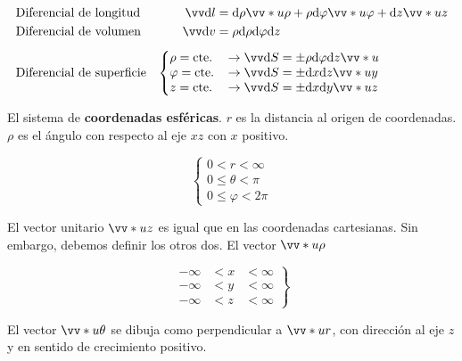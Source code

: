 \documentclass[10pt]{book}
\begin{document}
\begin{align*}
                           & \text{Diferencial de longitud}   & \vec{\dd l}  & = \dd \rho \vv*{u}{\rho} + \rho\dd \varphi \vv*{u}{\varphi} + \dd z \vv*{u}{z} \\
                           & \text{Diferencial de volumen}    & \vec{\dd v}  & = \rho \dd \rho \dd\varphi \dd z                                               \\[5 pt]
                           & \text{Diferencial de superficie} & \left\lbrace
  \begin{matrix*}[l]
    \rho = \text{cte.} \\
    \varphi = \text{cte.} \\
    z = \text{cte.}
  \end{matrix*} \right. &
  \begin{matrix*}[l]
    \quad \rightarrow \vec{\dd S} = \pm \rho \dd \varphi \dd z \vv*{u}{}\\
    \quad \rightarrow \vec{\dd S} = \pm \dd x \dd z \vv*{u}{y}\\
    \quad \rightarrow \vec{\dd S} = \pm \dd x \dd y \vv*{u}{z}
  \end{matrix*}                                                                                         \\
\end{align*}

El sistema de \textbf{coordenadas esféricas}. $r$ es la distancia al origen de coordenadas. $\rho$ es el ángulo con respecto al eje $xz$ con $x$ positivo.

\[\left\lbrace \begin{matrix}
    0 < r < \infty      \\
    0 \leq \theta < \pi \\
    0 \leq \varphi < 2\pi
  \end{matrix} \right. \]

El vector unitario $\vv*{u}{z}$ es igual que en las coordenadas cartesianas. Sin embargo, debemos definir los otros dos. El vector $\vv*{u}{\rho}$

\[ \left.
  \begin{matrix}
    -\infty & < x & < \infty \\
    -\infty & < y & < \infty \\
    -\infty & < z & < \infty
  \end{matrix} \right\rbrace \]

El vector $\vv*{u}{\theta}$ se dibuja como perpendicular a $\vv*{u}{r}$, con dirección al eje $z$ y en sentido de crecimiento positivo.
\end{document}
